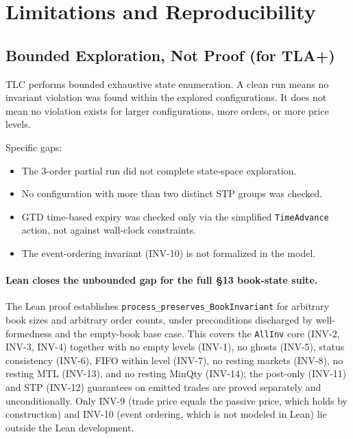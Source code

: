 \documentclass[11pt,a4paper]{article}
\begin{document}
\section{Limitations and Reproducibility}
\label{sec:limitations}

\subsection{Bounded Exploration, Not Proof (for TLA+)}

TLC performs bounded exhaustive state enumeration. A clean run means no
invariant violation was found within the explored configurations. It
does not mean no violation exists for larger configurations, more
orders, or more price levels.

Specific gaps:
\begin{itemize}[nosep]
\item The 3-order partial run did not complete state-space exploration.
\item No configuration with more than two distinct STP groups was
      checked.
\item GTD time-based expiry was checked only via the simplified
      \texttt{TimeAdvance} action, not against wall-clock constraints.
\item The event-ordering invariant (INV-10) is not formalized in the
      model.
\end{itemize}

\paragraph{Lean closes the unbounded gap for the full \S13 book-state
suite.} The Lean proof establishes
\texttt{process\_preserves\_BookInvariant} for arbitrary book sizes and
arbitrary order counts, under preconditions discharged by
well-formedness and the empty-book base case. This covers the
\texttt{AllInv} core (INV-2, INV-3, INV-4) together with no empty levels
(INV-1), no ghosts (INV-5), status consistency (INV-6), FIFO within
level (INV-7), no resting markets (INV-8), no resting MTL (INV-13), and
no resting MinQty (INV-14); the post-only (INV-11) and STP (INV-12)
guarantees on emitted trades are proved separately and unconditionally.
Only INV-9 (trade price equals the passive price, which holds by
construction) and INV-10 (event ordering, which is not modeled in Lean)
lie outside the Lean development.
\end{document}
